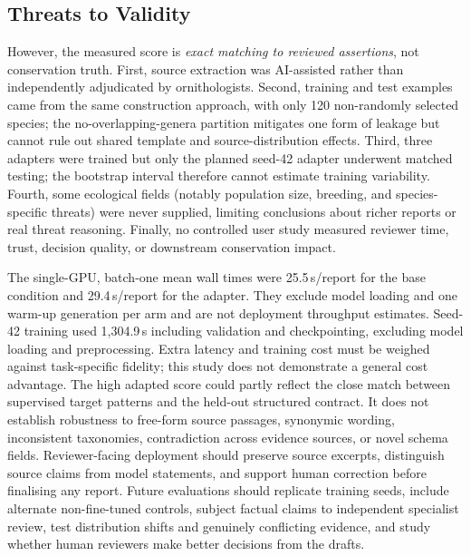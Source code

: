 \documentclass[a4paper,conference,10pt]{IEEEtran}
\begin{document}
\subsection{Threats to Validity}
However, the measured score is \emph{exact matching to reviewed assertions}, not conservation truth. First, source extraction was AI-assisted rather than independently adjudicated by ornithologists. Second, training and test examples came from the same construction approach, with only 120 non-randomly selected species; the no-overlapping-genera partition mitigates one form of leakage but cannot rule out shared template and source-distribution effects. Third, three adapters were trained but only the planned seed-42 adapter underwent matched testing; the bootstrap interval therefore cannot estimate training variability. Fourth, some ecological fields (notably population size, breeding, and species-specific threats) were never supplied, limiting conclusions about richer reports or real threat reasoning. Finally, no controlled user study measured reviewer time, trust, decision quality, or downstream conservation impact.

The single-GPU, batch-one mean wall times were 25.5\,s/report for the base condition and 29.4\,s/report for the adapter. They exclude model loading and one warm-up generation per arm and are not deployment throughput estimates. Seed-42 training used 1,304.9\,s including validation and checkpointing, excluding model loading and preprocessing. Extra latency and training cost must be weighed against task-specific fidelity; this study does not demonstrate a general cost advantage. The high adapted score could partly reflect the close match between supervised target patterns and the held-out structured contract. It does not establish robustness to free-form source passages, synonymic wording, inconsistent taxonomies, contradiction across evidence sources, or novel schema fields. Reviewer-facing deployment should preserve source excerpts, distinguish source claims from model statements, and support human correction before finalising any report. Future evaluations should replicate training seeds, include alternate non-fine-tuned controls, subject factual claims to independent specialist review, test distribution shifts and genuinely conflicting evidence, and study whether human reviewers make better decisions from the drafts.
\end{document}
